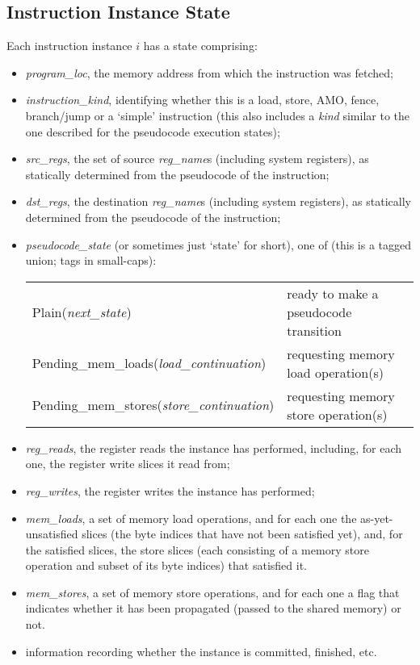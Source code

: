 \subsection{Instruction Instance State}\label{sec:omm:inst_state}
Each instruction instance $i$ has a state comprising:
\begin{itemize}
\item {\it program\_loc}, the memory address from which the instruction was fetched;
\item {\it instruction\_kind}, identifying whether this is a load, store, AMO, fence, branch/jump or a `simple' instruction (this also includes a {\it kind} similar to the one described for the pseudocode execution states);
\item {\it src\_regs}, the set of source {\it reg\_name}s (including system registers), as statically determined from the pseudocode of the instruction;
\item {\it dst\_regs}, the destination {\it reg\_name}s (including system registers), as statically determined from the pseudocode of the instruction;
\item {\it pseudocode\_state} (or sometimes just `state' for short), one of (this is a tagged union; tags in small-caps):
  \begin{center}
  \begin{tabular}{l@{ \quad-\quad }l}
  {\sc Plain}({\it next\_state})                        & ready to make a pseudocode transition \\
  {\sc Pending\_mem\_loads}({\it load\_continuation})   & requesting memory load operation(s) \\
  {\sc Pending\_mem\_stores}({\it store\_continuation}) & requesting memory store operation(s) \\
  \end{tabular}
  \end{center}

\item {\it reg\_reads}, the register reads the instance has performed, including, for each one, the register write slices it read from;
\item {\it reg\_writes}, the register writes the instance has performed;
\item {\it mem\_loads}, a set of memory load operations, and for each one
  the as-yet-unsatisfied slices (the byte indices that have not been
  satisfied yet), and, for the satisfied slices, the store slices
  (each consisting of a memory store operation and subset of its byte indices) that satisfied it.
\item {\it mem\_stores}, a set of memory store operations, and for each one a flag that indicates whether it has been propagated (passed to the shared memory) or not.
\item information recording whether the instance is committed, finished, etc.
\end{itemize}

